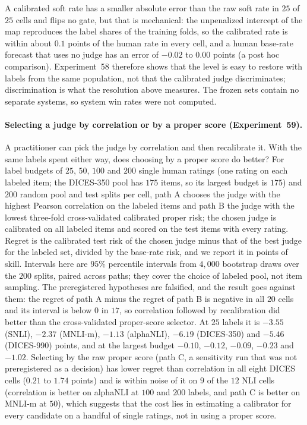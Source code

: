 A calibrated soft rate has a smaller absolute error than the raw soft rate in $25$ of $25$ cells and flips no gate, but that is mechanical: the unpenalized intercept of the map reproduces the label shares of the training folds, so the calibrated rate is within about $0.1$ points of the human rate in every cell, and a human base-rate forecast that uses no judge has an error of $-0.02$ to $0.00$ points (a post hoc comparison).
Experiment~58 therefore shows that the level is easy to restore with labels from the same population, not that the calibrated judge discriminates; discrimination is what the resolution above measures.
The frozen sets contain no separate systems, so system win rates were not computed.

\paragraph{Selecting a judge by correlation or by a proper score (Experiment~59).}
A practitioner can pick the judge by correlation and then recalibrate it.
With the same labels spent either way, does choosing by a proper score do better?
For label budgets of $25$, $50$, $100$ and $200$ single human ratings (one rating on each labeled item; the DICES-350 pool has $175$ items, so its largest budget is $175$) and $200$ random pool and test splits per cell, path A chooses the judge with the highest Pearson correlation on the labeled items and path B the judge with the lowest three-fold cross-validated calibrated proper risk; the chosen judge is calibrated on all labeled items and scored on the test items with every rating.
Regret is the calibrated test risk of the chosen judge minus that of the best judge for the labeled set, divided by the base-rate risk, and we report it in points of skill.
Intervals here are $95\%$ percentile intervals from $4{,}000$ bootstrap draws over the $200$ splits, paired across paths; they cover the choice of labeled pool, not item sampling.
The preregistered hypotheses are falsified, and the result goes against them: the regret of path A minus the regret of path B is negative in all $20$ cells and its interval is below $0$ in $17$, so correlation followed by recalibration did better than the cross-validated proper-score selector.
At $25$ labels it is $-3.55$ (SNLI), $-2.37$ (MNLI-m), $-1.13$ (alphaNLI), $-6.19$ (DICES-350) and $-5.46$ (DICES-990) points, and at the largest budget $-0.10$, $-0.12$, $-0.09$, $-0.23$ and $-1.02$.
Selecting by the raw proper score (path C, a sensitivity run that was not preregistered as a decision) has lower regret than correlation in all eight DICES cells ($0.21$ to $1.74$ points) and is within noise of it on $9$ of the $12$ NLI cells (correlation is better on alphaNLI at $100$ and $200$ labels, and path C is better on MNLI-m at $50$), which suggests that the cost lies in estimating a calibrator for every candidate on a handful of single ratings, not in using a proper score.
